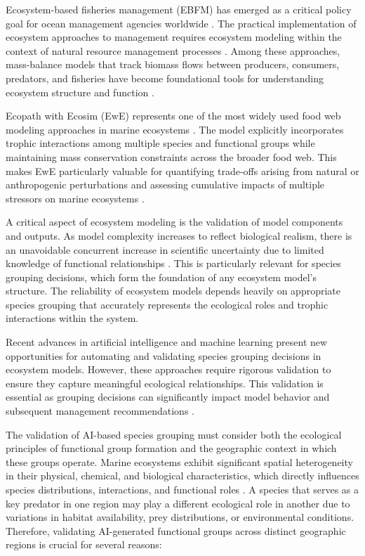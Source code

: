 Ecosystem-based fisheries management (EBFM) has emerged as a critical policy goal for ocean management agencies worldwide \citep{FAO2003, EuropeanCommission2013, NOAA2016}. The practical implementation of ecosystem approaches to management requires ecosystem modeling within the context of natural resource management processes \citep{Collie2016}. Among these approaches, mass-balance models that track biomass flows between producers, consumers, predators, and fisheries have become foundational tools for understanding ecosystem structure and function \citep{Christensen2004}.

Ecopath with Ecosim (EwE) represents one of the most widely used food web modeling approaches in marine ecosystems \citep{Christensen2004, Colleter2015}. The model explicitly incorporates trophic interactions among multiple species and functional groups while maintaining mass conservation constraints across the broader food web. This makes EwE particularly valuable for quantifying trade-offs arising from natural or anthropogenic perturbations and assessing cumulative impacts of multiple stressors on marine ecosystems \citep{Coll2015, Villasante2016}.

A critical aspect of ecosystem modeling is the validation of model components and outputs. As model complexity increases to reflect biological realism, there is an unavoidable concurrent increase in scientific uncertainty due to limited knowledge of functional relationships \citep{PlaganyiButterworth2004}. This is particularly relevant for species grouping decisions, which form the foundation of any ecosystem model's structure. The reliability of ecosystem models depends heavily on appropriate species grouping that accurately represents the ecological roles and trophic interactions within the system.

Recent advances in artificial intelligence and machine learning present new opportunities for automating and validating species grouping decisions in ecosystem models. However, these approaches require rigorous validation to ensure they capture meaningful ecological relationships. This validation is essential as grouping decisions can significantly impact model behavior and subsequent management recommendations \citep{Heymans2016, Link2010}.

The validation of AI-based species grouping must consider both the ecological principles of functional group formation and the geographic context in which these groups operate. Marine ecosystems exhibit significant spatial heterogeneity in their physical, chemical, and biological characteristics, which directly influences species distributions, interactions, and functional roles \citep{Longhurst2007}. A species that serves as a key predator in one region may play a different ecological role in another due to variations in habitat availability, prey distributions, or environmental conditions. Therefore, validating AI-generated functional groups across distinct geographic regions is crucial for several reasons:

